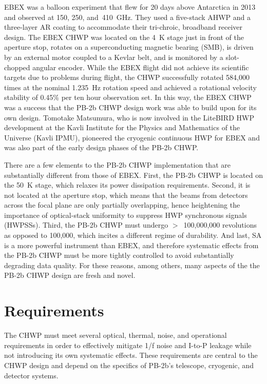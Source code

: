 EBEX was a balloon experiment that flew for 20 days above Antarctica in 2013 and observed at 150, 250, and~410~GHz. They used a five-stack AHWP and a three-layer AR coating to accommodate their tri-chroic, broadband receiver design. The EBEX CHWP was located on the 4~K stage just in front of the aperture stop, rotates on a superconducting magnetic bearing (SMB), is driven by an external motor coupled to a Kevlar belt, and is monitored by a slot-chopped angular encoder. While the EBEX flight did not achieve its scientific targets due to problems during flight, the CHWP successfully rotated 584,000 times at the nominal 1.235~Hz rotation speed and achieved a rotational velocity stability of 0.45\% per ten hour observation set. In this way, the EBEX CHWP was a success that the PB-2b CHWP design work was able to build upon for its own design. Tomotake Matsumura, who is now involved in the LiteBIRD HWP development at the Kavli Institute for the Physics and Mathematics of the Universe (Kavli IPMU), pioneered the cryogenic continuous HWP for EBEX and was also part of the early design phases of the PB-2b CHWP.

There are a few elements to the PB-2b CHWP implementation that are substantially different from those of EBEX. First, the PB-2b CHWP is located on the 50~K stage, which relaxes its power dissipation requirements. Second, it is not located at the aperture stop, which means that the beams from detectors across the focal plane are only partially overlapping, hence heightening the importance of optical-stack uniformity to suppress HWP synchronous signals (HWPSSs). Third, the PB-2b CHWP must undergo $>$~100,000,000 revolutions as opposed to 100,000, which incites a different regime of durability. And last, SA is a more powerful instrument than EBEX, and therefore systematic effects from the PB-2b CHWP must be more tightly controlled to avoid substantially degrading data quality. For these reasons, among others, many aspects of the the PB-2b CHWP design are fresh and novel.


\section{Requirements}
\label{sec:chwp_design_requirements}

The CHWP must meet several optical, thermal, noise, and operational requirements in order to effectively mitigate 1/f noise and I-to-P leakage while not introducing its own systematic effects. These requirements are central to the CHWP design and depend on the specifics of PB-2b's telescope, cryogenic, and detector systems. 

